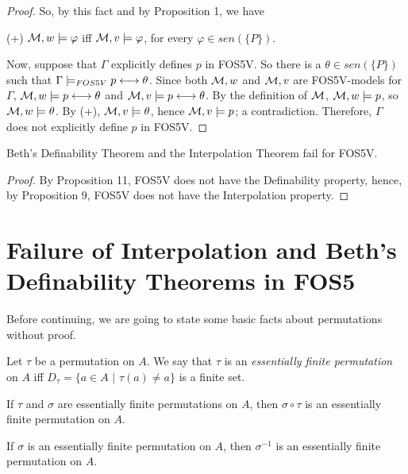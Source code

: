 \begin{proof}
\qquad So, by this fact and by Proposition 1, we have

\begin{center}
(+) $\mathcal{M},w \models \varphi$ iff $\mathcal{M},v \models \varphi$, for every $\varphi \in sen(\{P\})$.
\end{center}

\qquad Now, suppose that $\Gamma$ explicitly defines $p$ in FOS5V. So there is a $\theta \in sen(\{P\})$ such that $\Gamma \models_{FOS5V} p \longleftrightarrow \theta$. Since both $\mathcal{M},w$ and $\mathcal{M},v$ are FOS5V-models for $\Gamma$, $\mathcal{M},w \models p \longleftrightarrow \theta$ and $\mathcal{M},v \models p \longleftrightarrow \theta$. By the definition of $\mathcal{M}$, $\mathcal{M},w \models p$, so $\mathcal{M},w \models \theta$. By (+), $\mathcal{M},v \models \theta$, hence $\mathcal{M},v \models p$; a contradiction. Therefore, $\Gamma$ does not explicitly define $p$ in FOS5V.  
\end{proof}


\begin{teor}
Beth's Definability Theorem and the Interpolation Theorem fail for FOS5V. 
\end{teor}

\begin{proof}
By Proposition 11, FOS5V does not have the Definability property, hence, by Proposition 9, FOS5V does not have the Interpolation property.    
\end{proof}

\section{Failure of Interpolation and Beth's Definability  Theorems in FOS5}
\qquad Before continuing, we are going to state some basic facts about permutations without proof.

\begin{defn}
Let $\tau$ be a permutation on $A$. We say that $\tau$ is an \textit{essentially finite permutation} on $A$ iff $D_{\tau}= \{a \in A$ $|$ $ \tau(a)\neq a\}$ is a finite set.
\end{defn}

\begin{pro}
If $\tau$ and $\sigma$ are essentially finite permutations on $A$, then $\sigma\circ\tau$ is an essentially finite permutation on $A$.
\end{pro}

\begin{pro}
If $\sigma$ is an essentially finite permutation on $A$, then $\sigma^{-1}$ is an essentially finite permutation on $A$.
\end{pro}

